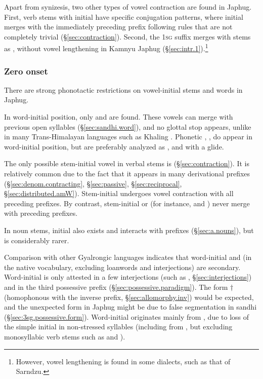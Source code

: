Apart from synizesis, two other types of vowel contraction are found in Japhug. First, verb stems with initial  have specific conjugation patterns, where initial  merges with the immediately preceding prefix following rules that are not completely trivial (§\ref{sec:contraction}). Second, the \textsc{1sg}  suffix merges with  stems as , without vowel lengthening in Kamnyu Japhug (§\ref{sec:intr.1}).\footnote{However, vowel lengthening is found in some dialects, such as that of Sarndzu. }

\subsubsection{Zero onset} \label{sec:zero.onset}
There are strong phonotactic restrictions on vowel-initial stems and words in Japhug. 

In word-initial position, only  and  are found. These vowels can merge with previous open syllables (§\ref{sec:sandhi.word}), and no glottal stop appears, unlike in many Trans-Himalayan languages such as Khaling \citep{jacques12khaling}. Phonetic  , ,  do appear in word-initial position, but are preferably analyzed as ,  and  with a glide.

The only possible stem-initial vowel in verbal stems is  (§\ref{sec:contraction}). It is relatively common due to the fact that it appears in many derivational prefixes (§\ref{sec:denom.contracting}, §\ref{sec:passive}, §\ref{sec:reciprocal}, §\ref{sec:distributed.amW}). Stem-initial  undergoes vowel contraction with all preceding prefixes. By contrast, stem-initial  or  (for instance,  and ) never merge with preceding prefixes.

In noun stems, initial  also exists and interacts with prefixes (§\ref{sec:a.nouns}), but is considerably rarer.

Comparison with other Gyalrongic languages indicates that word-initial  and  (in the native vocabulary, excluding loanwords and interjections) are secondary. Word-initial  is only attested in a few interjections (such as , §\ref{sec:interjections}) and in the third possessive prefix (§\ref{sec:possessive.paradigm}). The form $\dagger$ (homophonous with the inverse prefix, §\ref{sec:allomorphy.inv}) would be expected, and the unexpected form  in Japhug might be due to false segmentation in sandhi (§\ref{sec:3sg.possessive.form}). Word-initial  originates mainly from  \citep{jacques07passif}, due to loss of the simple initial  in non-stressed syllables (including  from , but excluding monosyllabic verb stems such as  and ).

